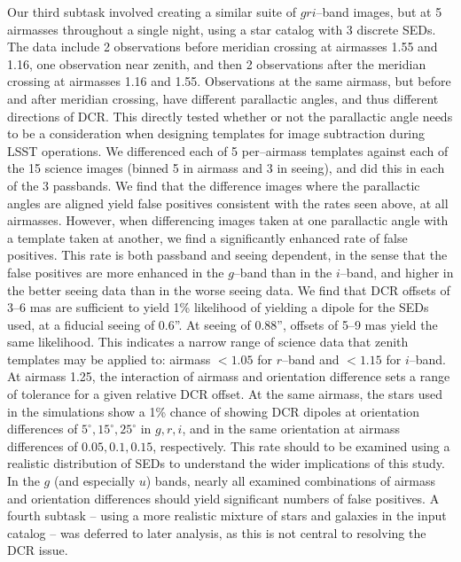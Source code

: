 \documentclass[prd, nofootinbib, floatfix, 11pt, tightenlines, times]{article}
\begin{document}
Our third subtask involved creating a similar suite of $gri$--band
images, but at 5 airmasses throughout a single night, using a star
catalog with 3 discrete SEDs.  The data include 2 observations before
meridian crossing at airmasses 1.55 and 1.16, one observation near
zenith, and then 2 observations after the meridian crossing at
airmasses 1.16 and 1.55.  Observations at the same airmass, but before
and after meridian crossing, have different parallactic angles, and
thus different directions of DCR.  This directly tested whether or not
the parallactic angle needs to be a consideration when designing
templates for image subtraction during LSST operations.  We
differenced each of 5 per--airmass templates against each of the 15
science images (binned 5 in airmass and 3 in seeing), and did this in
each of the 3 passbands.  We find that the difference images where the
parallactic angles are aligned yield false positives consistent with
the rates seen above, at all airmasses.  However, when differencing
images taken at one parallactic angle with a template taken at
another, we find a significantly enhanced rate of false positives.
This rate is both passband and seeing dependent, in the sense that the
false positives are more enhanced in the $g$--band than in the
$i$--band, and higher in the better seeing data than in the worse
seeing data.  We find that DCR offsets of 3--6 mas are sufficient to
yield 1\% likelihood of yielding a dipole for the SEDs used, at a
fiducial seeing of 0.6''.  At seeing of 0.88'', offsets of 5--9 mas
yield the same likelihood.  This indicates a narrow range of science
data that zenith templates may be applied to: airmass $<1.05$ for
$r$--band and $<1.15$ for $i$--band.  At airmass 1.25, the interaction
of airmass and orientation difference sets a range of tolerance for a
given relative DCR offset.  At the same airmass, the stars used in the
simulations show a 1\% chance of showing DCR dipoles at orientation
differences of $5^{\circ}, 15^{\circ}, 25^{\circ}$ in $g,r,i$, and in
the same orientation at airmass differences of $0.05, 0.1, 0.15$,
respectively.  This rate should to be examined using a realistic
distribution of SEDs to understand the wider implications of this
study.  In the $g$ (and especially $u$) bands, nearly all examined
combinations of airmass and orientation differences should yield
significant numbers of false positives.  A fourth subtask -- using a
more realistic mixture of stars and galaxies in the input catalog --
was deferred to later analysis, as this is not central to resolving
the DCR issue.
\end{document}
